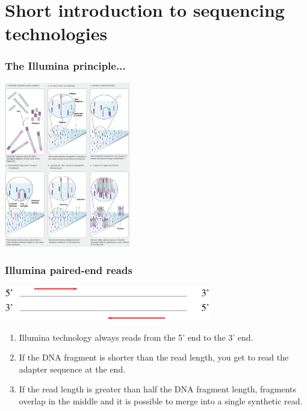 \documentclass{beamer}
\begin{document}

\section{Short introduction to sequencing technologies}


\begin{frame}
  \frametitle{The Illumina principle...}
  \begin{center}
    \includegraphics[width=5.5cm]{fig/illumina_workflow.jpg}
  \end{center}
\end{frame}



\begin{frame}
  \frametitle{Illumina paired-end reads}
  \begin{center}
    \includegraphics[width=9cm]{fig/illumina_reads_basic.pdf}
  \end{center}
  \begin{enumerate}
    \item Illumina technology always reads from the 5' end to the 3' end.
    \item If the DNA fragment is shorter than the read length, you get to read the adapter sequence at the end.
    \item If the read length is greater than half the DNA fragment length, fragments overlap in the middle and it is possible to merge into a single synthetic read.
  \end{enumerate}
\end{frame}
\end{document}
